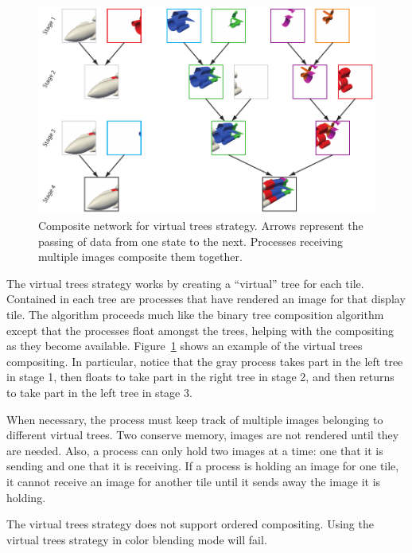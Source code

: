 \begin{figure}
  \centering
  \includegraphics{images/VTrees}
  \caption[Virtual trees composite network.]{Composite network for virtual
    trees strategy.  Arrows represent the passing of data from one state to
    the next.  Processes receiving multiple images composite them
    together.}
  \label{fig:VTreesComposite}
\end{figure}

The virtual trees strategy works by creating a ``virtual'' tree for each
tile.  Contained in each tree are processes that have rendered an image for
that display tile.  The algorithm proceeds much like the binary tree
composition algorithm except that the processes float amongst the trees,
helping with the compositing as they become available.
Figure~\ref{fig:VTreesComposite} shows an example of the virtual trees
compositing.  In particular, notice that the gray process takes part in the
left tree in stage 1, then floats to take part in the right tree in stage
2, and then returns to take part in the left tree in stage 3.

When necessary, the process must keep track of multiple images belonging to
different virtual trees.  Two conserve memory, images are not rendered
until they are needed.  Also, a process can only hold two images at a time:
one that it is sending and one that it is receiving.  If a process is
holding an image for one tile, it cannot receive an image for another tile
until it sends away the image it is holding.

The virtual trees strategy does not support ordered compositing.  Using the
virtual trees strategy in color blending mode will fail.


